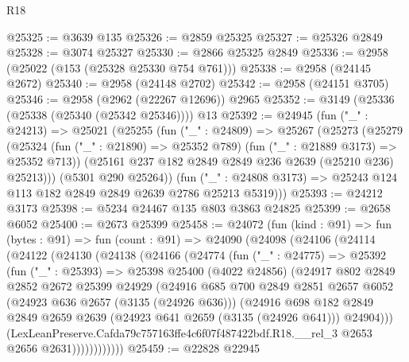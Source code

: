 \begin{lexlean}{R18}
\begin{coremodule}
@25325 := @3639 @135
@25326 := @2859 @25325
@25327 := @25326 @2849
@25328 := @3074 @25327
@25330 := @2866 @25325 @2849
@25336 := @2958 (@25022 (@153 (@25328 @25330 @754 @761)))
@25338 := @2958 (@24145 @2672)
@25340 := @2958 (@24148 @2702)
@25342 := @2958 (@24151 @3705)
@25346 := @2958 (@2962 (@22267 @12696)) @2965
@25352 := @3149 (@25336 (@25338 (@25340 (@25342 @25346)))) @13
@25392 := @24945
    (fun ("_" : @24213) =>
    @25021
      (@25255
        (fun ("_" : @24809) =>
        @25267
          (@25273
            (@25279
              (@25324 (fun ("_" : @21890) => @25352 @789) (fun ("_" : @21889 @3173) => @25352 @713))
              (@25161 @237 @182 @2849 @2849 @236 @2639 (@25210 @236) @25213)))
          (@5301 @290 @25264))
        (fun ("_" : @24808 @3173) => @25243 @124 @113 @182 @2849 @2849 @2639 @2786 @25213 @5319)))
@25393 := @24212 @3173
@25398 := @5234 @24467 @135 @803 @3863 @24825
@25399 := @2658 @6052
@25400 := @2673 @25399
@25458 := @24072
    (fun (kind : @91) =>
    fun (bytes : @91) =>
    fun (count : @91) =>
    @24090
      (@24098
        (@24106
          (@24114
            (@24122
              (@24130
                (@24138
                  (@24166
                    (@24774
                      (fun ("_" : @24775) =>
                      @25392
                        (fun ("_" : @25393) =>
                        @25398
                          @25400
                          (@4022 @24856)
                          (@24917
                            @802
                            @2849
                            @2852
                            @2672
                            @25399
                            @24929
                            (@24916
                              @685
                              @700
                              @2849
                              @2851
                              @2657
                              @6052
                              (@24923 @636 @2657 (@3135 (@24926 @636)))
                              (@24916
                                @698
                                @182
                                @2849
                                @2849
                                @2659
                                @2639
                                (@24923 @641 @2659 (@3135 (@24926 @641)))
                                @24904)))
                          (LexLeanPreserve.Cafda79c757163ffe4c6f07f487422bdf.R18.__rel_3
                            @2653
                            @2656
                            @2631))))))))))))
@25459 := @22828 @22945

\end{coremodule}
\end{lexlean}
